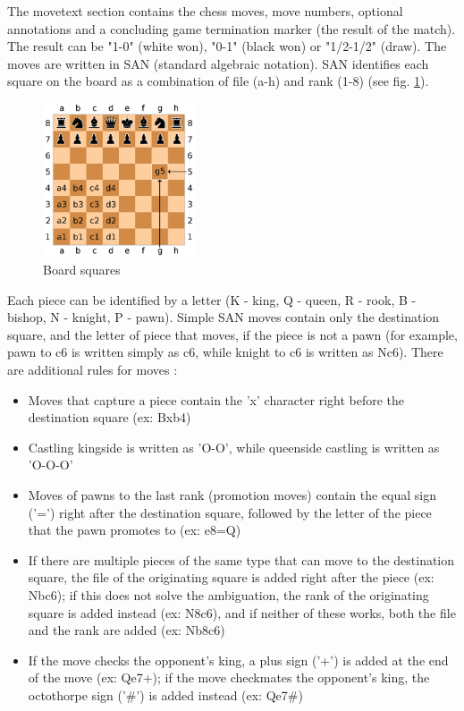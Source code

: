 The movetext section contains the chess moves, move numbers, optional annotations and a concluding game termination marker (the result of the match). The result can be "1-0" (white won), "0-1" (black won) or "1/2-1/2" (draw). The moves are written in SAN (standard algebraic notation). SAN identifies each square on the board as a combination of file (a-h) and rank (1-8) (see fig. \ref{fig:boardSquares}).

\begin{figure}[h]
    \centering
    \includegraphics[width=0.4\textwidth]{figures/board-squares.png}
    \caption{Board squares}
    \label{fig:boardSquares}
\end{figure}

Each piece can be identified by a letter (K - king, Q - queen, R - rook, B - bishop, N - knight, P - pawn). Simple SAN moves contain only the destination square, and the letter of piece that moves, if the piece is not a pawn (for example, pawn to c6 is written simply as c6, while knight to c6 is written as Nc6). There are additional rules for moves \cite{edwards1994standard}:
\begin{itemize}
    \item Moves that capture a piece contain the 'x' character right before the destination square (ex: Bxb4)
    \item Castling kingside is written as 'O-O', while queenside castling is written as 'O-O-O'
    \item Moves of pawns to the last rank (promotion moves) contain the equal sign ('=') right after the destination square, followed by the letter of the piece that the pawn promotes to (ex: e8=Q)
    \item If there are multiple pieces of the same type that can move to the destination square, the file of the originating square is added right after the piece (ex: Nbc6); if this does not solve the ambiguation, the rank of the originating square is added instead (ex: N8c6), and if neither of these works, both the file and the rank are added (ex: Nb8c6)
    \item If the move checks the opponent's king, a plus sign ('+') is added at the end of the move (ex: Qe7+); if the move checkmates the opponent's king, the octothorpe sign ('\#') is added instead (ex: Qe7\#)
\end{itemize}

